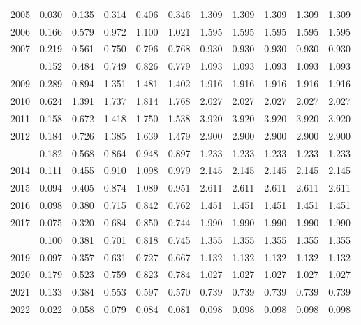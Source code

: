 \documentclass[
]{article}
\begin{document}
\begin{longtable}[t]{lrrrrrrrrrr}
2005 & 0.030 & 0.135 & 0.314 & 0.406 & 0.346 & 1.309 & 1.309 & 1.309 & 1.309 & 1.309\\
2006 & 0.166 & 0.579 & 0.972 & 1.100 & 1.021 & 1.595 & 1.595 & 1.595 & 1.595 & 1.595\\
2007 & 0.219 & 0.561 & 0.750 & 0.796 & 0.768 & 0.930 & 0.930 & 0.930 & 0.930 & 0.930\\
\addlinespace
2008 & 0.152 & 0.484 & 0.749 & 0.826 & 0.779 & 1.093 & 1.093 & 1.093 & 1.093 & 1.093\\
2009 & 0.289 & 0.894 & 1.351 & 1.481 & 1.402 & 1.916 & 1.916 & 1.916 & 1.916 & 1.916\\
2010 & 0.624 & 1.391 & 1.737 & 1.814 & 1.768 & 2.027 & 2.027 & 2.027 & 2.027 & 2.027\\
2011 & 0.158 & 0.672 & 1.418 & 1.750 & 1.538 & 3.920 & 3.920 & 3.920 & 3.920 & 3.920\\
2012 & 0.184 & 0.726 & 1.385 & 1.639 & 1.479 & 2.900 & 2.900 & 2.900 & 2.900 & 2.900\\
\addlinespace
2013 & 0.182 & 0.568 & 0.864 & 0.948 & 0.897 & 1.233 & 1.233 & 1.233 & 1.233 & 1.233\\
2014 & 0.111 & 0.455 & 0.910 & 1.098 & 0.979 & 2.145 & 2.145 & 2.145 & 2.145 & 2.145\\
2015 & 0.094 & 0.405 & 0.874 & 1.089 & 0.951 & 2.611 & 2.611 & 2.611 & 2.611 & 2.611\\
2016 & 0.098 & 0.380 & 0.715 & 0.842 & 0.762 & 1.451 & 1.451 & 1.451 & 1.451 & 1.451\\
2017 & 0.075 & 0.320 & 0.684 & 0.850 & 0.744 & 1.990 & 1.990 & 1.990 & 1.990 & 1.990\\
\addlinespace
2018 & 0.100 & 0.381 & 0.701 & 0.818 & 0.745 & 1.355 & 1.355 & 1.355 & 1.355 & 1.355\\
2019 & 0.097 & 0.357 & 0.631 & 0.727 & 0.667 & 1.132 & 1.132 & 1.132 & 1.132 & 1.132\\
2020 & 0.179 & 0.523 & 0.759 & 0.823 & 0.784 & 1.027 & 1.027 & 1.027 & 1.027 & 1.027\\
2021 & 0.133 & 0.384 & 0.553 & 0.597 & 0.570 & 0.739 & 0.739 & 0.739 & 0.739 & 0.739\\
2022 & 0.022 & 0.058 & 0.079 & 0.084 & 0.081 & 0.098 & 0.098 & 0.098 & 0.098 & 0.098\\*
\end{longtable}
\end{document}

